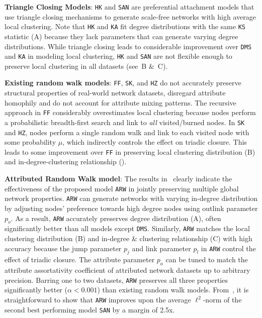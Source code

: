 \textbf{Triangle Closing Models}: \texttt{HK} and \texttt{SAN} are preferential attachment models
that use triangle closing mechanisms to generate scale-free networks with high average
local clustering.
Note that \texttt{HK} and \texttt{KA} fit degree distributions with the same \texttt{KS} statistic
(A) because they lack parameters that can generate varying degree distributions.
While triangle closing leads to considerable improvement over \texttt{DMS}
and \texttt{KA} in modeling local clustering, \texttt{HK} and \texttt{SAN} are not flexible enough
to preserve local clustering in {all} datasets (see~B \&~C).

\textbf{Existing random walk models}: \texttt{FF}, \texttt{SK}, and \texttt{HZ}
do not accurately preserve structural properties of real-world network datasets,
disregard attribute homophily and do not account for attribute mixing patterns.
The recursive approach in \texttt{FF} considerably overestimates local clustering
because nodes perform a probabilistic breadth-first search and link to \textit{all} visited/burned
nodes.
In \texttt{SK} and \texttt{HZ}, nodes perform a single random walk and link to
each visited node with some probability $\mu$, which indirectly
controls the effect on triadic closure. This leads to some improvement over \texttt{FF} in preserving local
clustering distribution (B) and in-degree-clustering relationship ().

\textbf{Attributed Random Walk model}: The results in~ clearly indicate the effectiveness
of the proposed model \texttt{ARW} in {jointly} preserving multiple
global network properties. \texttt{ARW} can generate networks with varying
in-degree distribution by adjusting nodes' preference towards high degree nodes
using outlink parameter $p_o$. As a result, \texttt{ARW} accurately preserves
degree distribution (A), often significantly better
than all models except \texttt{DMS}. Similarly, \texttt{ARW} matches the local clustering
distribution  (B) and in-degree \& clustering relationship
(C) with high accuracy because the jump parameter $p_j$ and
link parameter $p_l$ in \texttt{ARW} control the effect of triadic closure.
The attribute parameter $p_a$ can be tuned to match the attribute assortativity
coefficient of attributed network datasets up to arbitrary precision.
Barring one to two datasets, \texttt{ARW} preserves all three properties significantly
better ($\alpha < 0.001$) than existing random walk models.
From~, it is straightforward to show that
\texttt{ARW} improves upon the average $\ell^2$-norm of the second best performing model
\texttt{SAN} by a margin of 2.5x.


